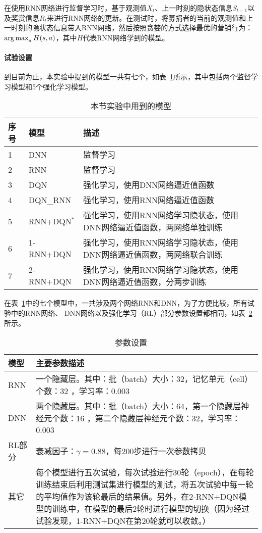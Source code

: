 在使用RNN网络进行监督学习时，基于观测值$X_{t}$、上一时刻的隐状态信息$S_{t-1}$以及奖赏信息$R_{t}$来进行RNN网络的更新。在测试时，将募捐者的当前的观测值和上一时刻的隐状态信息带入RNN网络，然后按照贪婪的方式选择最优的营销行为：$\operatorname*{arg\,max}_{a} H(s,a)$，其中$H$代表RNN网络学到的模型。

\paragraph{试验设置}
到目前为止，本实验中提到的模型一共有七个，如表~\ref{tab:4modesl}所示，其中包括两个监督学习模型和5个强化学习模型。
 \begin{table}[htbp]
  \centering
  \caption{本节实验中用到的模型}
  \label{tab:4modesl}
  \begin{tabular}{llp{10cm}}  
    \toprule
      序号 & 模型 & 描述 \\
    \midrule
      1 & DNN & 监督学习\\
      2 & RNN & 监督学习\\
      3 & DQN & 强化学习，使用DNN网络逼近值函数\\
      4 & DQN_RNN & 强化学习，使用RNN网络逼近值函数\\
      5 & RNN+DQN$^{*}$ & 强化学习，使用RNN网络学习隐状态，使用DNN网络逼近值函数，两网络单独训练\\
      6 & 1-RNN+DQN & 强化学习，使用RNN网络学习隐状态，使用DNN网络逼近值函数，两网络联合训练\\
      7 & 2-RNN+DQN & 强化学习，使用RNN网络学习隐状态，使用DNN网络逼近值函数，分两步训练 \\        	  
    \bottomrule
  \end{tabular}
\end{table}

在表~\ref{tab:4modesl}中的七个模型中，一共涉及两个网络RNN和DNN，为了方便比较，所有试验中的RNN网络、  DNN网络以及强化学习（RL）部分参数设置都相同，如表~\ref{tab:4wangluocanshu}所示。

 \begin{table}[htbp]
  \centering
  \caption{参数设置}
  \label{tab:4wangluocanshu}
  \begin{tabular}{lp{12.1cm}}  
    \toprule
      模型 & 主要参数描述 \\
    \midrule
      RNN &一个隐藏层。其中：批（batch）大小：32，记忆单元（cell）个数：32 ，学习率：0.003\\
      DNN &两个隐藏层。其中：批（batch）大小：64，第一个隐藏层神经元个数：16 ，第二个隐藏层神经元个数：32，学习率：0.003\\
      RL部分 & 衰减因子：$\gamma=0.88$，每200步进行一次参数拷贝 \\ 
      其它 & 每个模型进行五次试验，每次试验进行30轮（epoch），在每轮训练结束后利用测试集进行模型的测试，将五次试验中每一轮的平均值作为该轮最后的结果值。另外，在2-RNN+DQN模型的训练中，在模型的最后2轮时进行模型的切换（因为经过试验发现，1-RNN+DQN在第20轮就可以收敛。）\\       	  
    \bottomrule
  \end{tabular}
\end{table}

